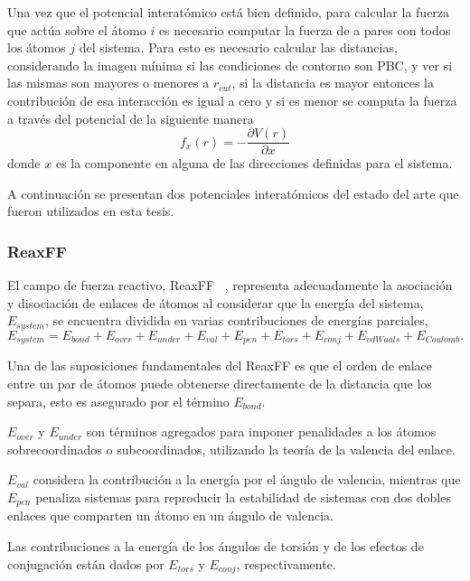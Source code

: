 Una vez que el potencial interatómico está bien definido, para calcular la fuerza
que actúa sobre el átomo $i$ es necesario computar la fuerza de a pares con todos
los átomos $j$ del sistema. Para esto es necesario calcular las distancias,
considerando la imagen mínima si las condiciones de contorno son PBC, y ver si
las mismas son mayores o menores a $r_{cut}$, si la distancia es mayor entonces
la contribución de esa interacción es igual a cero y si es menor se computa la 
fuerza a través del potencial de la siguiente manera
\begin{equation*}
f_x(r) = - \frac{\partial V(r)}{\partial x}
\end{equation*}
donde $x$ es la componente en alguna de las direcciones definidas para el sistema.

A continuación se presentan dos potenciales interatómicos del estado del arte que
fueron utilizados en esta tesis.

\subsubsection{ReaxFF}\label{s:reaxff}

El campo de fuerza reactivo, ReaxFF ~\cite{reaxff}, representa adecuadamente la
asociación y disociación de enlaces de átomos al considerar que la energía del 
sistema, $E_{system}$, se encuentra dividida en varias contribuciones de energías
parciales,
\begin{equation*}
E_{system} = E_{bond} + E_{over} + E_{under} + E_{val} + E_{pen} + E_{tors} + E_{conj} + E_{vdWaals} + E_{Coulomb}.
\end{equation*}

Una de las suposiciones fundamentales del ReaxFF es que el orden de enlace entre
un par de átomos puede obtenerse directamente de la distancia que los separa, 
esto es asegurado por el término $E_{bond}$.

$E_{over}$ y $E_{under}$ son términos agregados para imponer penalidades a los
átomos sobrecoordinados o subcoordinados, utilizando la teoría de la valencia 
del enlace.

$E_{val}$ considera la contribución a la energía por el ángulo de valencia, 
mientras que $E_{pen}$ penaliza sistemas para reproducir la estabilidad de 
sistemas con dos dobles enlaces que comparten un átomo en un ángulo de valencia.

Las contribuciones a la energía de los ángulos de torsión y de los efectos de 
conjugación están dados por $E_{tors}$ y $E_{conj}$, respectivamente.


